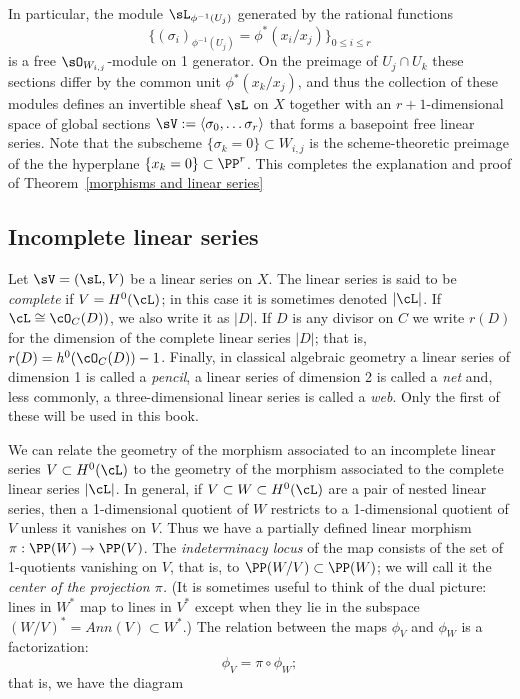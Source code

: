In particular, the module $\sL_{\phi^{-1}(U_j)}$ generated by the rational functions 
$$
\{(\sigma_i)_{\phi^{-1}(U_j)} = \phi^*(x_i/x_j)\}_{0\leq i\leq r}
$$
 is a free $\sO_{W_{i,j}}$-module on 1 generator. On the preimage of $U_j\cap U_k$ these sections differ by the common unit $\phi^*(x_k/x_j)$, and thus the collection of these modules defines an invertible sheaf $\sL$ on $X$ together with an
$r+1$-dimensional space of global sections $\sV := \langle \sigma_0,\dots \sigma_r\rangle$ that forms a basepoint free linear series. Note that the subscheme  $\{\sigma_k = 0\} \subset W_{i,j}$  is the scheme-theoretic preimage of the
the hyperplane $\{x_k = 0\}\subset \PP^r$. This completes the explanation and proof of Theorem~\ref{morphisms and linear series}


\subsection{Incomplete linear series}


Let $\sV = (\sL, V)$ be a linear series on $X$.  The linear series is said to be \emph{complete} if $V = H^0(\cL)$; in this case it is sometimes denoted $|\cL|$. If $\cL \cong \cO_C(D))$, we also write it as $|D|$. 
 If $D$ is any divisor on $C$ we write $r(D)$ for the dimension of the complete linear series $|D|$; that is, $r(D) = h^0(\cO_C(D)) - 1$. Finally, in classical algebraic geometry a linear series of dimension 1 is called a \emph{pencil}, a linear series of dimension 2 is called a \emph{net} and, less commonly, a three-dimensional linear series is called a \emph{web}.  Only the first of these will be
 used in this book.

We can relate the geometry of the morphism associated to an incomplete linear series $V \subset H^0(\cL)$ to the geometry of the morphism associated to the complete linear series $|\cL|$. In general, if $V \subset W \subset H^0(\cL)$ are a pair of nested linear series, then a 1-dimensional quotient of $W$ restricts to a 1-dimensional quotient of $V$ unless it vanishes on $V$.
Thus we have a partially defined linear morphism $\pi: \PP(W)  \to \PP(V)$. The \emph{indeterminacy locus} of the map
consists of the set of 1-quotients vanishing on $V$, that is, to $\PP(W/V) \subset \PP(W)$; we will call it the 
\emph{center of the projection $\pi$.} (It is sometimes useful to
think of the dual picture: lines in $W^*$ map to lines in $V^*$ except when they lie in the subspace $(W/V)^* = Ann(V)\subset W^*$.)
The relation between the maps $\phi_V$ and $\phi_W$ is a factorization:
$$
\phi_V = \pi \circ \phi_W;
$$
that is, we have the diagram 

